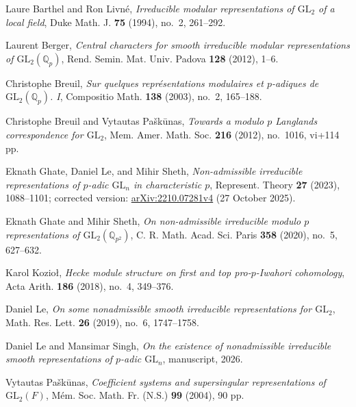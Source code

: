 \documentclass[10pt]{article}
\let\originalthebibliography\thebibliography
\let\originalendthebibliography\endthebibliography
\renewenvironment{thebibliography}[1]
  {\originalthebibliography{#1}\small
   \setlength{\itemsep}{3pt plus 1pt}\setlength{\parsep}{0pt}}
  {\originalendthebibliography}
\theoremstyle{plain}
\theoremstyle{definition}
\theoremstyle{remark}
\newcommand{\Qp}{\mathbb{Q}_p}
\newcommand{\GL}{\mathrm{GL}}
\begin{document}
\begin{thebibliography}{GLS23}

Laure Barthel and Ron Livn\'e,
\emph{Irreducible modular representations of $\GL_2$ of a local field},
Duke Math. J. \textbf{75} (1994), no.~2, 261--292.

Laurent Berger,
\emph{Central characters for smooth irreducible modular representations of $\GL_2(\Qp)$},
Rend. Semin. Mat. Univ. Padova \textbf{128} (2012), 1--6.

Christophe Breuil,
\emph{Sur quelques repr\'esentations modulaires et $p$-adiques de $\GL_2(\Qp)$. I},
Compositio Math. \textbf{138} (2003), no.~2, 165--188.

Christophe Breuil and Vytautas Pa\v{s}k\=unas,
\emph{Towards a modulo $p$ Langlands correspondence for $\GL_2$},
Mem. Amer. Math. Soc. \textbf{216} (2012), no.~1016, vi+114 pp.

Eknath Ghate, Daniel Le, and Mihir Sheth,
\emph{Non-admissible irreducible representations of $p$-adic $\GL_n$ in characteristic $p$},
Represent. Theory \textbf{27} (2023), 1088--1101;
corrected version: \href{https://arxiv.org/abs/2210.07281v4}{arXiv:2210.07281v4} (27 October 2025).

Eknath Ghate and Mihir Sheth,
\emph{On non-admissible irreducible modulo $p$ representations of $\GL_2(\mathbb{Q}_{p^2})$},
C. R. Math. Acad. Sci. Paris \textbf{358} (2020), no.~5, 627--632.

Karol Kozio\l,
\emph{Hecke module structure on first and top pro-$p$-Iwahori cohomology},
Acta Arith. \textbf{186} (2018), no.~4, 349--376.

Daniel Le,
\emph{On some nonadmissible smooth irreducible representations for $\GL_2$},
Math. Res. Lett. \textbf{26} (2019), no.~6, 1747--1758.

Daniel Le and Mansimar Singh,
\emph{On the existence of nonadmissible irreducible smooth representations of $p$-adic $\GL_n$},
manuscript, 2026.

Vytautas Pa\v{s}k\=unas,
\emph{Coefficient systems and supersingular representations of $\GL_2(F)$},
M\'em. Soc. Math. Fr. (N.S.) \textbf{99} (2004), 90 pp.

\end{thebibliography}
\end{document}
